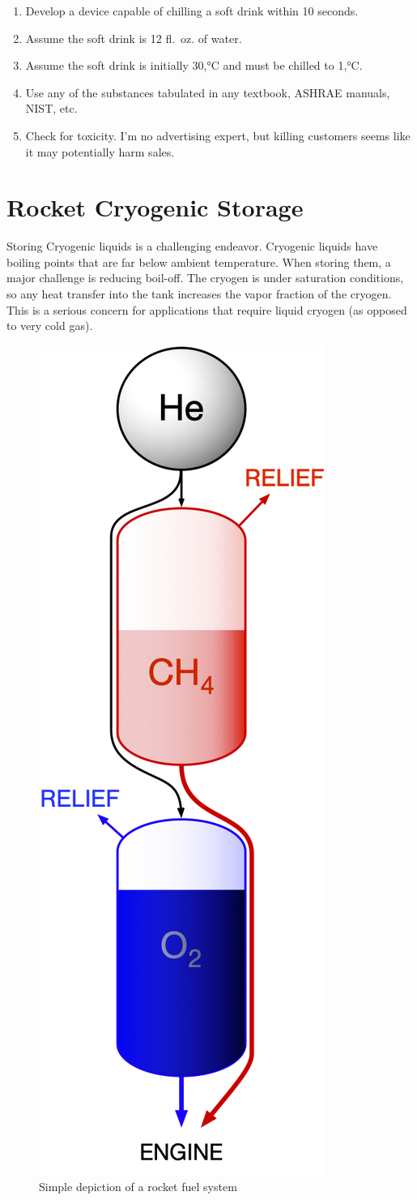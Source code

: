\documentclass[]{tufte-book}
\providecommand{\tightlist}{%
  \setlength{\itemsep}{0pt}\setlength{\parskip}{0pt}}
\begin{document}
\begin{enumerate}
\def\labelenumi{\arabic{enumi}.}
\tightlist
\item
  Develop a device capable of chilling a soft drink within 10 seconds.
\item
  Assume the soft drink is 12 fl.~oz. of water.\\
\item
  Assume the soft drink is initially 30,°C and must be chilled to 1,°C.
\item
  Use any of the substances tabulated in any textbook, ASHRAE manuals, NIST, etc.
\item
  Check for toxicity. I'm no advertising expert, but killing customers seems like it may potentially harm sales.
\end{enumerate}

\hypertarget{rocket-cryogenic-storage}{%
\chapter{Rocket Cryogenic Storage}\label{rocket-cryogenic-storage}}

Storing Cryogenic liquids is a challenging endeavor.
Cryogenic liquids have boiling points that are far below ambient temperature.
When storing them, a major challenge is reducing boil-off.
The cryogen is under saturation conditions, so any heat transfer into the tank increases the vapor fraction of the cryogen. This is a serious concern for applications that require liquid cryogen (as opposed to very cold gas).

\begin{figure}

{\centering \includegraphics[width=0.25\linewidth]{./figures/rocket-fuel} 

}

\caption[Simple depiction of a rocket fuel system]{Simple depiction of a rocket fuel system}\label{fig:rocket-fuel}
\end{figure}
\end{document}
